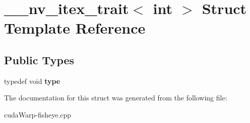 \hypertarget{struct____nv__itex__trait_3_01int_01_4}{}\section{\+\_\+\+\_\+nv\+\_\+itex\+\_\+trait$<$ int $>$ Struct Template Reference}
\label{struct____nv__itex__trait_3_01int_01_4}
\subsection*{Public Types}
\begin{DoxyCompactItemize}
\item 
typedef void {\bfseries type}\hypertarget{struct____nv__itex__trait_3_01int_01_4_afba75b1954cee8118eea8a361d12e138}{}\label{struct____nv__itex__trait_3_01int_01_4_afba75b1954cee8118eea8a361d12e138}

\end{DoxyCompactItemize}


The documentation for this struct was generated from the following file\+:\begin{DoxyCompactItemize}
\item 
cuda\+Warp-\/fisheye.\+cpp\end{DoxyCompactItemize}
